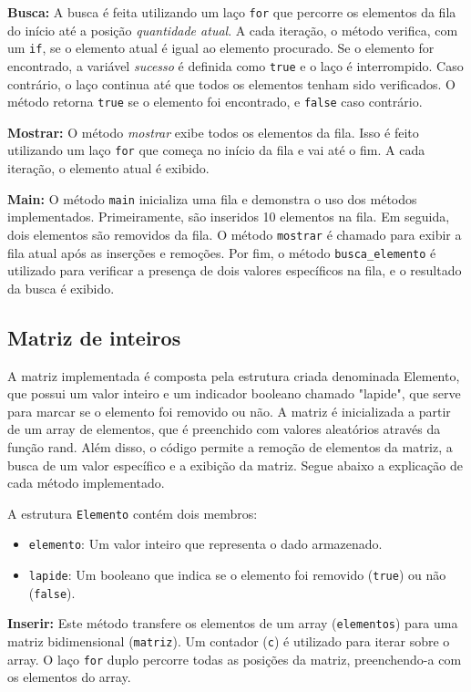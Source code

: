 \documentclass[12pt]{article}
\begin{document}
\textbf{Busca:} A busca é feita utilizando um laço \texttt{for} que percorre os elementos da fila do início até a posição \textit{quantidade atual}. A cada iteração, o método verifica, com um \texttt{if}, se o elemento atual é igual ao elemento procurado. Se o elemento for encontrado, a variável \textit{sucesso} é definida como \texttt{true} e o laço é interrompido. Caso contrário, o laço continua até que todos os elementos tenham sido verificados. O método retorna \texttt{true} se o elemento foi encontrado, e \texttt{false} caso contrário.

\textbf{Mostrar:} O método \textit{mostrar} exibe todos os elementos da fila. Isso é feito utilizando um laço \texttt{for} que começa no início da fila e vai até o fim. A cada iteração, o elemento atual é exibido.

\textbf{Main:} O método \texttt{main} inicializa uma fila e demonstra o uso dos métodos implementados. Primeiramente, são inseridos 10 elementos na fila. Em seguida, dois elementos são removidos da fila. O método \texttt{mostrar} é chamado para exibir a fila atual após as inserções e remoções. Por fim, o método \texttt{busca\_elemento} é utilizado para verificar a presença de dois valores específicos na fila, e o resultado da busca é exibido.

\subsection{Matriz de inteiros}

 A matriz implementada é composta pela estrutura criada denominada Elemento, que possui um valor inteiro e um indicador booleano chamado "lapide", que serve para marcar se o elemento foi removido ou não. A matriz é inicializada a partir de um array de elementos, que é preenchido com valores aleatórios através da função rand. Além disso, o código permite a remoção de elementos da matriz, a busca de um valor específico e a exibição da matriz. Segue abaixo a explicação de cada método implementado.

 A estrutura \texttt{Elemento} contém dois membros:
\begin{itemize}
    \item \texttt{elemento}: Um valor inteiro que representa o dado armazenado.
    \item \texttt{lapide}: Um booleano que indica se o elemento foi removido (\texttt{true}) ou não (\texttt{false}).
\end{itemize}

\textbf{Inserir:} Este método transfere os elementos de um array (\texttt{elementos}) para uma matriz bidimensional (\texttt{matriz}). Um contador (\texttt{c}) é utilizado para iterar sobre o array. O laço \texttt{for} duplo percorre todas as posições da matriz, preenchendo-a com os elementos do array.
\end{document}

